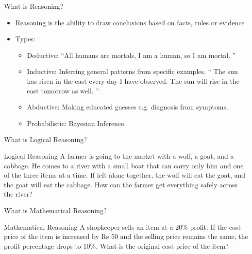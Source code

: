 \begin{frame}[fragile]{What is Reasoning?}
    \begin{itemize}
        \item Reasoning is the ability to draw conclusions based on facts, rules or evidence
		\item Types:
			    \begin{itemize}
				\item  Deductive: ``All humans are mortals, I am a human, so I am mortal. ''
				\item  Inductive: Inferring general patterns from specific examples. `` The sun has risen in the east every day I have observed. The sun will rise in the east tomorrow as well. ''
				\item  Abductive: Making educated guesses e.g. diagnosis from symptoms.
				\item  Probabilistic: Bayesian Inference.
			\end{itemize}
    \end{itemize}
\end{frame}

\begin{frame}[fragile]{What is Logical Reasoning?}
    \begin{block}{Logical Reasoning}
		A farmer is going to the market with a wolf, a goat, 
		and a cabbage. He comes to a river with a small boat 
		that can carry only him and one of the three items at 
		a time. If left alone together, the wolf will eat the goat, 
		and the goat will eat the cabbage. How can the 
		farmer get everything safely across the river?
    \end{block}
\end{frame}

\begin{frame}[fragile]{What is Mathematical Reasoning?}
    \begin{block}{Mathematical Reasoning}
		 A shopkeeper sells an item at a 20\% profit. If the 
		cost price of the item is increased by Rs 50 and the 
		selling price remains the same, the profit 
		percentage drops to 10\%. What is the original cost 
		price of the item?
    \end{block}
\end{frame}

